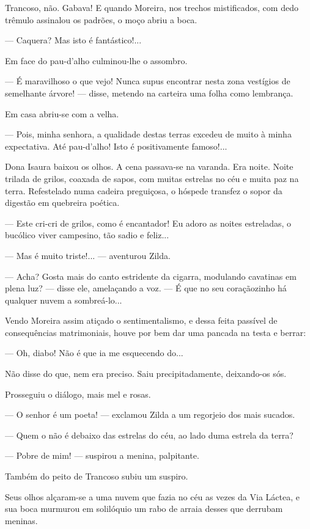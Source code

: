 Trancoso, não. Gabava! E quando Moreira, nos trechos mistificados, com
dedo trêmulo assinalou os padrões, o moço abriu a boca.

--- Caquera? Mas isto é fantástico!...

Em face do pau-d'alho culminou-lhe o assombro.

--- É maravilhoso o que vejo! Nunca supus encontrar nesta zona vestígios
de semelhante árvore! --- disse, metendo na carteira uma folha como
lembrança.

Em casa abriu-se com a velha.

--- Pois, minha senhora, a qualidade destas terras excedeu de muito à
minha expectativa. Até pau-d'alho! Isto é positivamente famoso!...

Dona Isaura baixou os olhos. A cena passava-se na varanda. Era noite.
Noite trilada de grilos, coaxada de sapos, com muitas estrelas no céu e
muita paz na terra. Refestelado numa cadeira preguiçosa, o hóspede
transfez o sopor da digestão em quebreira poética.

--- Este cri-cri de grilos, como é encantador! Eu adoro as noites
estreladas, o bucólico viver campesino, tão sadio e feliz...

--- Mas é muito triste!... --- aventurou Zilda.

--- Acha? Gosta mais do canto estridente da cigarra, modulando cavatinas
em plena luz? --- disse ele, amelaçando a voz. --- É que no seu
coraçãozinho há qualquer nuvem a sombreá-lo...

Vendo Moreira assim atiçado o sentimentalismo, e dessa feita passível de
consequências matrimoniais, houve por bem dar uma pancada na testa e
berrar:

--- Oh, diabo! Não é que ia me esquecendo do...

Não disse do que, nem era preciso. Saiu precipitadamente, deixando-os
sós.

Prosseguiu o diálogo, mais mel e rosas.

--- O senhor é um poeta! --- exclamou Zilda a um regorjeio dos mais
sucados.

--- Quem o não é debaixo das estrelas do céu, ao lado duma estrela da
terra?

--- Pobre de mim! --- suspirou a menina, palpitante.

Também do peito de Trancoso subiu um suspiro.

Seus olhos alçaram-se a uma nuvem que fazia no céu as vezes da Via
Láctea, e sua boca murmurou em solilóquio um rabo de arraia desses que
derrubam meninas.

